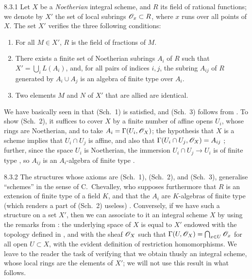 \begin{env}{8.3.1}
\label{env-1.8.3.1}
Let $X$ be a \emph{Noetherian} integral scheme, and $R$ its
field of rational functions; we denote by $X'$ the set of local subrings
$\mathscr{O}_x\subset R$, where $x$ runs over all points of $X$. The set $X'$ verifies
the three following conditions:
\begin{enumerate}
  \item[(Sch.~1)] For all $M\in X'$, $R$ is the field of fractions of $M$.
  \item[(Sch.~2)] There exists a finite set of Noetherian subrings $A_i$ of $R$
  such that $X'=\bigcup_i L(A_i)$, and, for all pairs of indices $i,j$, the subring
  $A_{ij}$ of $R$ generated by $A_i\cup A_j$ is an algebra of finite type over $A_i$.
  \item[(Sch.~3)] Two elements $M$ and $N$ of $X'$ that are allied are identical.
\end{enumerate}
\end{env}

We have basically seen in  that (Sch.~1) is satisfied, and (Sch.~3)
follows from . To show (Sch.~2), it suffices to cover $X$ by a
finite number of affine opens $U_i$, whose rings are Noetherian, and to take
$A_i=\Gamma(U_i,\mathscr{O}_X)$; the hypothesis that $X$ is a scheme implies that
$U_i\cap U_j$ is affine, and also that $\Gamma(U_i\cap U_j,\mathscr{O}_X)=A_{ij}$
; further, since the space $U_i$ is Noetherian, the immersion
$U_i\cap U_j\to U_i$ is of finite type , so $A_{ij}$ is an
$A_i$-algebra of finite type .

\begin{env}{8.3.2}
\label{env-1.8.3.2}
The structures whose axioms are (Sch.~1), (Sch.~2), and
(Sch.~3), generalise ``schemes'' in the sense of C.~Chevalley, who supposes
furthermore that $R$ is an extension of finite type of a field $K$, and that the
$A_i$ are $K$-algebras of finite type (which renders a part of (Sch.~2) useless)
\cite{1}. Conversely, if we have such a structure on a set $X'$, then we can
associate to it an integral scheme $X$ by using the remarks from :
the underlying space of $X$ is equal to $X'$ endowed with the topology defined
in , and with the sheaf $\mathscr{O}_X$ such that
$\Gamma(U,\mathscr{O}_X)=\bigcap_{x\in U}\mathscr{O}_x$ for all open $U\subset X$, with the
evident definition of restriction homomorphisms. We leave to the reader the
task of verifying that we obtain thusly an integral scheme, whose local rings
are the elements of $X'$; we will not use this result in what follows.
\end{env}

